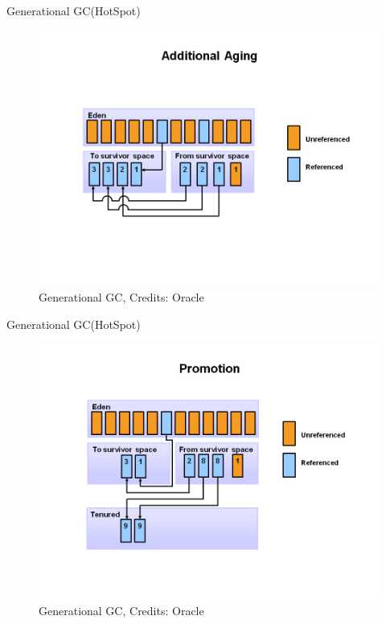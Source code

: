 \documentclass{beamer}
\begin{document}
\begin{frame}{Generational GC(HotSpot)}
\begin{figure}
	\centering
	\includegraphics[width=0.9\linewidth]{Images/generational4}
	\caption{Generational GC, Credits: Oracle}
\end{figure}
\end{frame}

\begin{frame}{Generational GC(HotSpot)}
\begin{figure}
	\centering
	\includegraphics[width=0.9\linewidth]{Images/generational5}
	\caption{Generational GC, Credits: Oracle}
\end{figure}
\end{frame}
\end{document}
